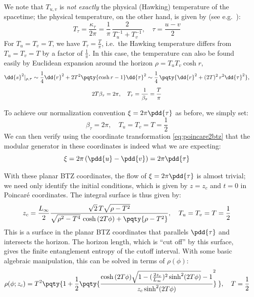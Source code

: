 \documentclass[a4paper
	,10pt
]{article}
\begin{document}
	We note that $T_{u,v}$ is \textit{not exactly} the physical (Hawking) temperature of the spacetime; the physical temperature, on the other hand, is given by (see e.g.~\cite{Compere:2018aar}):
	\begin{equation}
		T_\tau = \frac{\kappa_\tau}{2\pi}
		= \frac{1}{\pi}\,
			\frac{2}{T_u^{-1} + T_v^{-1}},
	\quad
		\tau = \frac{u - v}{2}
	\end{equation}
	For $T_u = T_v = T$, we have $T_\tau = \frac{T}{\pi}$, i.e.~the Hawking temperature differs from $T_u = T_v = T$ by a factor of $\frac{1}{\pi}$. In this case, the temperature can also be found easily by Euclidean expansion around the horizon $\rho = T_u T_v \cosh r$,
	\begin{gather}
		\dd{s}^2|_{\rho,\tau}
		\sim \frac{1}{4} \dd{r}^2
			+ 2T^2 \pqty{\cosh r - 1}
				\dd{\tau}^2
		\sim \frac{1}{4}\,\pqty{
				\dd{r}^2
				+ (2T)^2\,r^2 \dd{\tau}^2
			},
	\\[1ex]
		2T\beta_\tau = 2\pi,
	\quad
		T_\tau = \frac{1}{\beta_\tau} = \frac{T}{\pi}
	\end{gather}
	
	To achieve our normalization convention $\xi = 2\pi \pdd{\tau}$ as before, we simply set:
	\begin{equation}
		\beta_\tau = 2\pi,
	\quad
		T_u = T_v = T = \frac{1}{2}
	\end{equation}
	We can then verify using the coordinate transformation \eqref{eq:poincare2btz} that the modular generator in these coordinates is indeed what we are expecting:
	\begin{equation}
		\xi
		= 2\pi\,(\pdd{u} - \pdd{v})
		= 2\pi\pdd{\tau}
	\end{equation}
	
	With these planar BTZ coordinates, the flow of $\xi = 2\pi\pdd{\tau}$ is almost trivial; we need only identify the initial conditions, which is given by $z = z_c$ and $t = 0$ in Poincar\'e coordinates. The integral surface is thus given by:
	\begin{equation}
		z_c = \frac{L_\infty}{2} \frac{
				\sqrt{2}\,T
				\sqrt{\rho - T^2}
			}{
				\sqrt{\rho^2 - T^4}
					\,\cosh\,(2T\phi)
				+ \pqty{\rho - T^2}
			},
	\quad
		T_u = T_v = T = \frac{1}{2}
	\end{equation}
	This is a surface in the planar BTZ coordinates that parallels $\pdd{\tau}$ and intersects the horizon. The horizon length, which is ``cut off'' by this surface, gives the finite entanglement entropy of the cutoff interval.
	With some basic algebraic manipulation, this can be solved in terms of $\rho(\phi)$:
	\begin{equation}
		\rho(\phi;z_c)
		= T^2 \pqty{
			1 + \frac{1}{2} \pqty{
				\frac{
					\cosh\,(2T\phi) \sqrt{
						1 - (\frac{2z_c}{L_\infty})^2 \sinh^2 (2T\phi)
					} - 1
				}{z_c\sinh^2 (2T\phi)}
			}^{\!\!\!\!2\ }
		},\quad
		T = \frac{1}{2}
	\end{equation}
	
\end{document}
